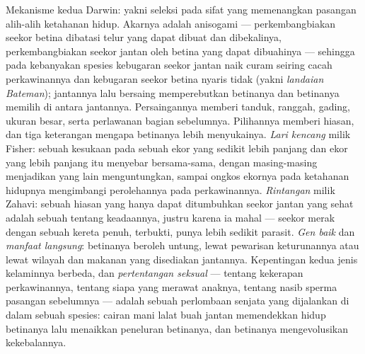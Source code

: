 \begin{definition}\label{def:b3:behavioural-ecology:sexual-selection}
%
Mekanisme kedua Darwin: yakni seleksi pada sifat yang memenangkan pasangan alih-alih
ketahanan hidup. Akarnya adalah anisogami --- perkembangbiakan seekor betina
dibatasi telur yang dapat dibuat dan dibekalinya, perkembangbiakan seekor jantan oleh betina
yang dapat dibuahinya --- sehingga pada kebanyakan spesies kebugaran seekor jantan naik
curam seiring cacah perkawinannya dan kebugaran seekor betina nyaris tidak (yakni
\emph{landaian Bateman}); jantannya lalu bersaing memperebutkan betinanya dan betinanya
memilih di antara jantannya. Persaingannya memberi tanduk, ranggah, gading, ukuran
besar, serta perlawanan bagian sebelumnya. Pilihannya memberi hiasan,
dan tiga keterangan mengapa betinanya lebih menyukainya. \emph{Lari kencang} milik Fisher:
sebuah kesukaan pada sebuah ekor yang sedikit lebih panjang dan ekor yang lebih panjang itu menyebar
bersama-sama, dengan masing-masing menjadikan yang lain menguntungkan, sampai ongkos ekornya pada
ketahanan hidupnya mengimbangi perolehannya pada perkawinannya. \emph{Rintangan} milik Zahavi: sebuah
hiasan yang hanya dapat ditumbuhkan seekor jantan yang sehat adalah sebuah  tentang keadaannya, justru karena ia mahal --- seekor merak
dengan sebuah kereta penuh, terbukti, punya lebih sedikit parasit. \emph{Gen baik}
dan \emph{manfaat langsung}: betinanya beroleh untung, lewat pewarisan keturunannya
atau lewat wilayah dan makanan yang disediakan jantannya.
Kepentingan kedua jenis kelaminnya berbeda, dan \emph{pertentangan seksual} --- tentang
kekerapan perkawinannya, tentang siapa yang merawat anaknya, tentang nasib sperma
pasangan sebelumnya --- adalah sebuah perlombaan senjata yang dijalankan di dalam sebuah spesies:
cairan mani lalat buah jantan memendekkan hidup betinanya lalu
menaikkan peneluran betinanya, dan betinanya mengevolusikan kekebalannya.
\end{definition}

